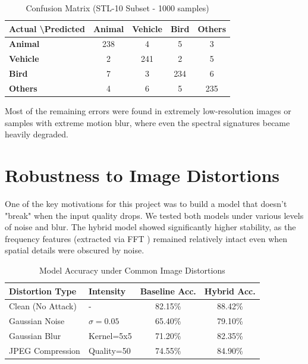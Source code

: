 \begin{table}[h!]
    \centering
    \caption{Confusion Matrix (STL-10 Subset - 1000 samples)}
    \label{tab:confusion_matrix}
    \begin{tabular}{|l|c|c|c|c|}
        \hline
        \textbf{Actual \textbackslash Predicted} & \textbf{Animal} & \textbf{Vehicle} & \textbf{Bird} & \textbf{Others} \\ \hline
        \textbf{Animal}    & 238             & 4                & 5             & 3               \\ \hline
        \textbf{Vehicle}   & 2               & 241              & 2             & 5               \\ \hline
        \textbf{Bird}      & 7               & 3                & 234           & 6               \\ \hline
        \textbf{Others}    & 4               & 6                & 5             & 235             \\ \hline
    \end{tabular}
\end{table}

Most of the remaining errors were found in extremely low-resolution images or samples with extreme motion blur, where even the spectral signatures became heavily degraded.

\section{Robustness to Image Distortions}

One of the key motivations for this project was to build a model that doesn't "break" when the input quality drops. We tested both models under various levels of noise and blur. The hybrid model showed significantly higher stability, as the frequency features (extracted via FFT \cite{fft}) remained relatively intact even when spatial details were obscured by noise.

\begin{table}[h!]
    \centering
    \caption{Model Accuracy under Common Image Distortions}
    \label{tab:robustness_results}
    \begin{tabular}{|l|l|c|c|}
        \hline
        \textbf{Distortion Type} & \textbf{Intensity} & \textbf{Baseline Acc.} & \textbf{Hybrid Acc.} \\ \hline
        Clean (No Attack)        & -                  & 82.15\%                & 88.42\%              \\ \hline
        Gaussian Noise           & $\sigma=0.05$      & 65.40\%                & 79.10\%              \\ \hline
        Gaussian Blur            & Kernel=5x5         & 71.20\%                & 82.35\%              \\ \hline
        JPEG Compression         & Quality=50         & 74.55\%                & 84.90\%              \\ \hline
    \end{tabular}
\end{table}

